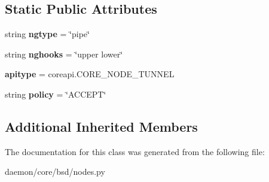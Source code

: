 \subsection*{Static Public Attributes}
\begin{DoxyCompactItemize}
\item 
\hypertarget{classcore_1_1bsd_1_1nodes_1_1_tunnel_node_acc8908eba922f57f770f02255c559fb7}{string {\bfseries ngtype} = \char`\"{}pipe\char`\"{}}\label{classcore_1_1bsd_1_1nodes_1_1_tunnel_node_acc8908eba922f57f770f02255c559fb7}

\item 
\hypertarget{classcore_1_1bsd_1_1nodes_1_1_tunnel_node_a51c0cf36d69db0b6cba32e1169d8084f}{string {\bfseries nghooks} = \char`\"{}upper lower\char`\"{}}\label{classcore_1_1bsd_1_1nodes_1_1_tunnel_node_a51c0cf36d69db0b6cba32e1169d8084f}

\item 
\hypertarget{classcore_1_1bsd_1_1nodes_1_1_tunnel_node_a0e34329bc3e0787ee1cb9f3a2f7c72bb}{{\bfseries apitype} = coreapi.\+C\+O\+R\+E\+\_\+\+N\+O\+D\+E\+\_\+\+T\+U\+N\+N\+E\+L}\label{classcore_1_1bsd_1_1nodes_1_1_tunnel_node_a0e34329bc3e0787ee1cb9f3a2f7c72bb}

\item 
\hypertarget{classcore_1_1bsd_1_1nodes_1_1_tunnel_node_a69ba54d2dd514311ca449013e05a1700}{string {\bfseries policy} = \char`\"{}A\+C\+C\+E\+P\+T\char`\"{}}\label{classcore_1_1bsd_1_1nodes_1_1_tunnel_node_a69ba54d2dd514311ca449013e05a1700}

\end{DoxyCompactItemize}
\subsection*{Additional Inherited Members}


The documentation for this class was generated from the following file\+:\begin{DoxyCompactItemize}
\item 
daemon/core/bsd/nodes.\+py\end{DoxyCompactItemize}

